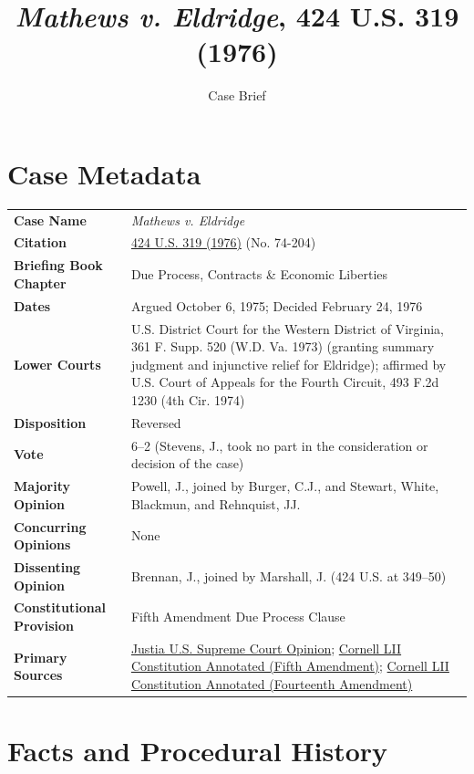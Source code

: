 \documentclass[12pt]{article}
\title{\textit{Mathews v. Eldridge}, 424 U.S. 319 (1976)}
\author{Case Brief}
\date{}
\begin{document}
\maketitle

\section{Case Metadata}

\begin{tabular}{@{}p{}p{}@{}}
\hline
\textbf{Case Name} & \emph{Mathews v. Eldridge} \\
\textbf{Citation} & \href{https://supreme.justia.com/cases/federal/us/424/319/}{424 U.S. 319 (1976)} (No. 74-204) \\
\textbf{Briefing Book Chapter} & Due Process, Contracts \& Economic Liberties \\
\textbf{Dates} & Argued October 6, 1975; Decided February 24, 1976 \\
\textbf{Lower Courts} & U.S. District Court for the Western District of Virginia, 361 F. Supp. 520 (W.D. Va. 1973) (granting summary judgment and injunctive relief for Eldridge); affirmed by U.S. Court of Appeals for the Fourth Circuit, 493 F.2d 1230 (4th Cir. 1974) \\
\textbf{Disposition} & Reversed \\
\textbf{Vote} & 6--2 (Stevens, J., took no part in the consideration or decision of the case) \\
\textbf{Majority Opinion} & Powell, J., joined by Burger, C.J., and Stewart, White, Blackmun, and Rehnquist, JJ. \\
\textbf{Concurring Opinions} & None \\
\textbf{Dissenting Opinion} & Brennan, J., joined by Marshall, J. (424 U.S. at 349--50) \\
\textbf{Constitutional Provision} & Fifth Amendment Due Process Clause \\
\textbf{Primary Sources} & \href{https://supreme.justia.com/cases/federal/us/424/319/}{Justia U.S. Supreme Court Opinion}; \href{https://www.law.cornell.edu/constitution-conan/amendment-5/mathews-test}{Cornell LII Constitution Annotated (Fifth Amendment)}; \href{https://www.law.cornell.edu/constitution-conan/amendment-14/due-process-test-in-mathews-v-eldridge}{Cornell LII Constitution Annotated (Fourteenth Amendment)} \\
\hline
\end{tabular}

\section{Facts and Procedural History}
\end{document}
